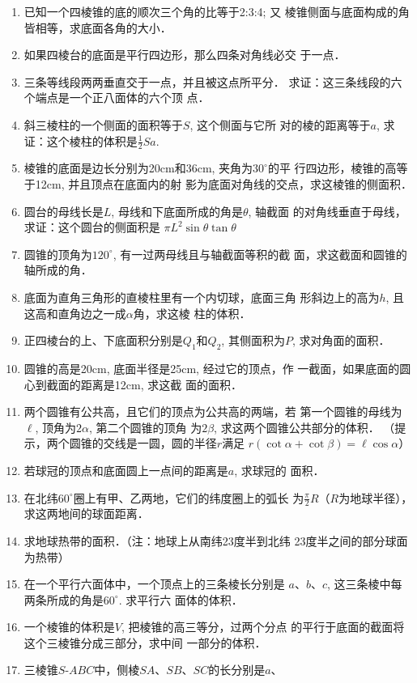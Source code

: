 \begin{enumerate}
\item 已知一个四棱锥的底的顺次三个角的比等于2:3:4; 又
棱锥侧面与底面构成的角皆相等，求底面各角的大小．
\item 如果四棱台的底面是平行四边形，那么四条对角线必交
于一点．
\item 三条等线段两两垂直交于一点，并且被这点所平分．
求证：这三条线段的六个端点是一个正八面体的六个顶
点．
\item 斜三棱柱的一个侧面的面积等于$S$, 这个侧面与它所
对的棱的距离等于$a$, 求证：这个棱柱的体积是$\frac{1}{2}Sa$.
\item 棱锥的底面是边长分别为20cm和36cm, 夹角为$30^{\circ}$的平
行四边形，棱锥的高等于12cm, 并且顶点在底面内的射
影为底面对角线的交点，求这棱锥的侧面积．
\item 圆台的母线长是$L$, 母线和下底面所成的角是$\theta$, 轴截面
的对角线垂直于母线，求证：这个圆台的侧面积是
$\pi L^2\sin\theta \tan\theta$
\item 圆锥的顶角为$120^{\circ}$, 有一过两母线且与轴截面等积的截
面，求这截面和圆锥的轴所成的角．
\item 底面为直角三角形的直棱柱里有一个内切球，底面三角
形斜边上的高为$h$, 且这高和直角边之一成$\alpha$角，求这棱
柱的体积．
\item 正四棱台的上、下底面积分别是$Q_1$和$Q_2$, 其侧面积为$P$, 
求对角面的面积．
\item 圆锥的高是20cm, 底面半径是25cm, 经过它的顶点，作
一截面，如果底面的圆心到截面的距离是12cm, 求这截
面的面积．
\item 两个圆锥有公共高，且它们的顶点为公共高的两端，若
第一个圆锥的母线为$\ell$, 顶角为$2\alpha$, 第二个圆锥的顶角
为$2\beta$, 求这两个圆锥公共部分的体积．
（提示，两个圆锥的交线是一圆，圆的半径$r$满足
$r(\cot\alpha+\cot\beta)=\ell\cos\alpha$）
\item 若球冠的顶点和底面圆上一点间的距离是$a$, 求球冠的
面积．
\item 在北纬$60^{\circ}$圈上有甲、乙两地，它们的纬度圈上的弧长
为$\frac{\pi}{2}R$（$R$为地球半径），求这两地间的球面距离．
\item 求地球热带的面积．（注：地球上从南纬23度半到北纬
23度半之间的部分球面为热带）
\item 在一个平行六面体中，一个顶点上的三条棱长分别是
$a$、$b$、$c$, 这三条棱中每两条所成的角是$60^{\circ}$. 求平行六
面体的体积．
\item 一个棱锥的体积是$V$, 把棱锥的高三等分，过两个分点
的平行于底面的截面将这个三棱锥分成三部分，求中间
一部分的体积．
\item 三棱锥$S$-$ABC$中，侧棱$SA$、$SB$、$SC$的长分别是$a$、

\end{enumerate}
